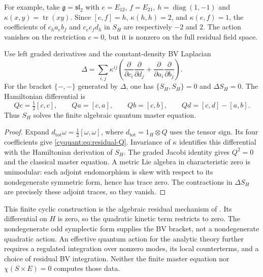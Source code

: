 For example, take $\mathfrak g=\mathfrak{sl}_2$ with
$e=E_{12}$, $f=E_{21}$, $h=\operatorname{diag}(1,-1)$ and
$\kappa(x,y)=\operatorname{tr}(xy)$.  Since
$[e,f]=h$, $\kappa(h,h)=2$, and $\kappa(e,f)=1$, the coefficients of
$c_h a_e b_f$ and $c_e c_f d_h$ in $S_H$ are respectively $-2$ and $2$.
The action vanishes on the restriction $c=0$, but it is nonzero on the
full residual field space.

\begin{proposition}\label{cyquant:prop:finite-qme}
Use left graded derivatives and the constant-density BV Laplacian
\[
 \Delta=\sum_{i,j}\kappa^{ij}
 \left(\frac{\partial}{\partial c_i}\frac{\partial}{\partial d_j}
       +\frac{\partial}{\partial a_i}\frac{\partial}{\partial b_j}\right).
\]
For the bracket $\{-,-\}$ generated by $\Delta$, one has
$\{S_H,S_H\}=0$ and $\Delta S_H=0$.  The Hamiltonian differential is
\begin{equation}\label{cyquant:eq:residual-Q}
 Qc=\tfrac12[c,c],\qquad Qa=[c,a],\qquad Qb=[c,b],\qquad
 Qd=[c,d]-[a,b].
\end{equation}
Thus $S_H$ solves the finite algebraic quantum master equation.
\end{proposition}

\begin{proof}
Expand $d_{\mathrm{tot}}\omega=\frac12[\omega,\omega]$, where
$d_{\mathrm{tot}}=1_H\otimes Q$ uses the tensor sign.
Its four coefficients give
\eqref{cyquant:eq:residual-Q}.  Invariance of $\kappa$ identifies this
differential with the Hamiltonian derivation of $S_H$.  The graded Jacobi
identity gives $Q^2=0$ and the classical master equation.  A metric Lie
algebra in characteristic zero is unimodular: each adjoint endomorphism
is skew with respect to its nondegenerate symmetric form, hence has trace
zero.  The contractions in $\Delta S_H$ are precisely these adjoint
traces, so they vanish.
\end{proof}

This finite cyclic construction is the algebraic residual mechanism of
\cite[\S3.1]{cyquant:CattaneoMnev}.  Its differential on $H$ is zero,
so the quadratic kinetic term restricts to zero.  The nondegenerate odd
symplectic form supplies the BV bracket, not a nondegenerate quadratic
action.  An effective quantum action for the analytic theory further
requires a regulated integration over nonzero modes, its local
counterterms, and a choice of residual BV integration.  Neither the
finite master equation nor $\chi(S\times E)=0$ computes those data.

